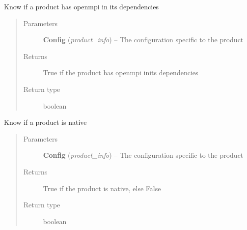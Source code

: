 \documentclass[a4paper,10pt,english]{sphinxmanual}
\begin{document}
\begin{fulllineitems}
\label{commands/apidoc/src:src.product.product_is_mpi}
Know if a product has openmpi in its dependencies
\begin{quote}\begin{description}
\item[{Parameters}] \leavevmode
\textbf{Config} (\emph{product\_info}) -- The configuration specific to 
the product

\item[{Returns}] \leavevmode
True if the product has openmpi inits dependencies

\item[{Return type}] \leavevmode
boolean

\end{description}\end{quote}

\end{fulllineitems}


\begin{fulllineitems}
\label{commands/apidoc/src:src.product.product_is_native}
Know if a product is native
\begin{quote}\begin{description}
\item[{Parameters}] \leavevmode
\textbf{Config} (\emph{product\_info}) -- The configuration specific to 
the product

\item[{Returns}] \leavevmode
True if the product is native, else False

\item[{Return type}] \leavevmode
boolean

\end{description}\end{quote}

\end{fulllineitems}

\end{document}
